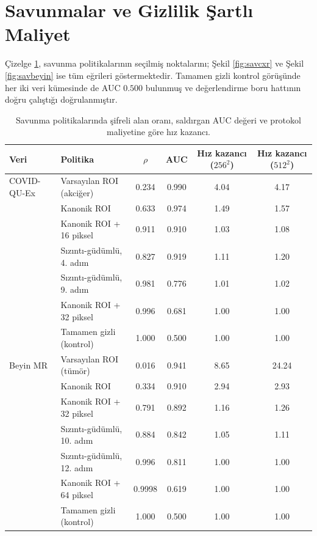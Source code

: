 \section{Savunmalar ve Gizlilik Şartlı Maliyet}\label{sec:res:defense}

Çizelge \ref{tbl:savunma}, savunma politikalarının seçilmiş noktalarını; Şekil \ref{fig:savcxr} ve Şekil \ref{fig:savbeyin} ise tüm eğrileri göstermektedir. Tamamen gizli kontrol görüşünde her iki veri kümesinde de AUC $0.500$ bulunmuş ve değerlendirme boru hattının doğru çalıştığı doğrulanmıştır.

\begin{table}[h!]
{\setlength{\tabcolsep}{5pt}
\caption{Savunma politikalarında şifreli alan oranı, saldırgan AUC değeri ve protokol maliyetine göre hız kazancı.}
\begin{center}
\vspace{-6mm}
\begin{tabular}{llcccc}
\hline\hline
Veri & Politika & $\rho$ & AUC & Hız kazancı ($256^2$) & Hız kazancı ($512^2$) \\
\hline
COVID-QU-Ex & Varsayılan ROI (akciğer) & 0.234 & 0.990 & 4.04 & 4.17 \\
 & Kanonik ROI & 0.633 & 0.974 & 1.49 & 1.57 \\
 & Kanonik ROI + 16 piksel & 0.911 & 0.910 & 1.03 & 1.08 \\
 & Sızıntı-güdümlü, 4. adım & 0.827 & 0.919 & 1.11 & 1.20 \\
 & Sızıntı-güdümlü, 9. adım & 0.981 & 0.776 & 1.01 & 1.02 \\
 & Kanonik ROI + 32 piksel & 0.996 & 0.681 & 1.00 & 1.00 \\
 & Tamamen gizli (kontrol) & 1.000 & 0.500 & 1.00 & 1.00 \\
\hline
Beyin MR & Varsayılan ROI (tümör) & 0.016 & 0.941 & 8.65 & 24.24 \\
 & Kanonik ROI & 0.334 & 0.910 & 2.94 & 2.93 \\
 & Kanonik ROI + 32 piksel & 0.791 & 0.892 & 1.16 & 1.26 \\
 & Sızıntı-güdümlü, 10. adım & 0.884 & 0.842 & 1.05 & 1.11 \\
 & Sızıntı-güdümlü, 12. adım & 0.996 & 0.811 & 1.00 & 1.00 \\
 & Kanonik ROI + 64 piksel & 0.9998 & 0.619 & 1.00 & 1.00 \\
 & Tamamen gizli (kontrol) & 1.000 & 0.500 & 1.00 & 1.00 \\
\hline
\end{tabular}
\vspace{-6mm}
\end{center}
\label{tbl:savunma}}
\end{table}

